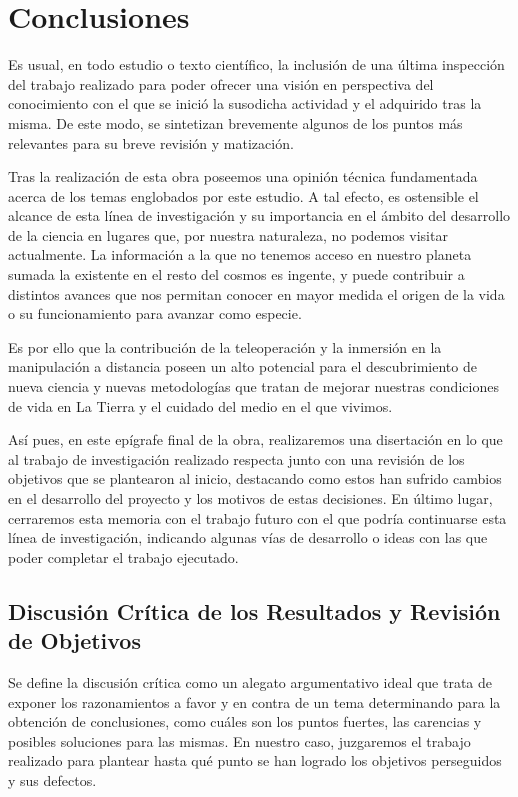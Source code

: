 \chapter{Conclusiones}
Es usual, en todo estudio o texto científico, la inclusión de una última inspección del trabajo realizado para poder ofrecer una visión en perspectiva del conocimiento con el que se inició la susodicha actividad y el adquirido tras la misma. De este modo, se sintetizan brevemente algunos de los puntos más relevantes para su breve revisión y matización.

Tras la realización de esta obra poseemos una opinión técnica fundamentada acerca de los temas englobados por este estudio. A tal efecto, es ostensible el alcance de esta línea de investigación y su importancia en el ámbito del desarrollo de la ciencia en lugares que, por nuestra naturaleza, no podemos visitar actualmente. La información a la que no tenemos acceso en nuestro planeta sumada la existente en el resto del cosmos es ingente, y puede contribuir a distintos avances que nos permitan conocer en mayor medida el origen de la vida  o su funcionamiento para avanzar como especie. 

Es por ello que la contribución de la teleoperación y la inmersión en la manipulación a distancia poseen un alto potencial para el descubrimiento de nueva ciencia y nuevas metodologías que tratan de mejorar nuestras condiciones de vida en La Tierra y el cuidado del medio en el que vivimos. 

Así pues, en este epígrafe final de la obra, realizaremos una disertación en lo que al trabajo de investigación realizado respecta junto con una revisión de los objetivos que se plantearon al inicio, destacando como estos han sufrido cambios en el desarrollo del proyecto y los motivos de estas decisiones. En último lugar, cerraremos esta memoria con el trabajo futuro con el que podría continuarse esta línea de investigación, indicando algunas vías de desarrollo o ideas con las que poder completar el trabajo ejecutado.

\vfill

\section{Discusión Crítica de los Resultados y Revisión de Objetivos}
Se define la discusión crítica como un alegato argumentativo ideal que trata de exponer los razonamientos a favor y en contra de un tema determinando para la obtención de conclusiones, como cuáles son los puntos fuertes, las carencias y posibles soluciones para las mismas. En nuestro caso, juzgaremos el trabajo realizado para plantear hasta qué punto se han logrado los objetivos perseguidos y sus defectos. 

